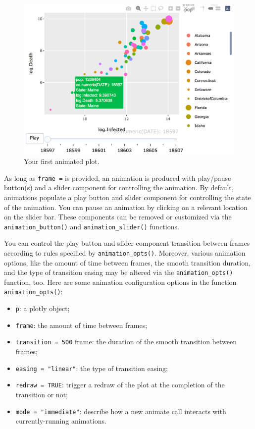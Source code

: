 \documentclass[]{book}
\providecommand{\tightlist}{%
  \setlength{\itemsep}{0pt}\setlength{\parskip}{0pt}}
\begin{document}
\begin{figure}

{\centering \includegraphics[width=1\linewidth]{figures/animation1} 

}

\caption{Your first animated plot.}\label{fig:animate1}
\end{figure}

As long as \texttt{frame\ =} is provided, an animation is produced with
play/pause button(s) and a slider component for controlling the
animation. By default, animations populate a play button and slider
component for controlling the state of the animation. You can pause an
animation by clicking on a relevant location on the slider bar. These
components can be removed or customized via the
\texttt{animation\_button()} and \texttt{animation\_slider()} functions.

You can control the play button and slider component transition between
frames according to rules specified by \texttt{animation\_opts()}.
Moreover, various animation options, like the amount of time between
frames, the smooth transition duration, and the type of transition
easing may be altered via the \texttt{animation\_opts()} function, too.
Here are some animation configuration options in the function
\texttt{animation\_opts()}:

\begin{itemize}
\tightlist
\item
  \texttt{p}: a plotly object;
\item
  \texttt{frame}: the amount of time between frames;
\item
  \texttt{transition\ =\ 500} frame: the duration of the smooth
  transition between frames;
\item
  \texttt{easing\ =\ "linear"}: the type of transition easing;
\item
  \texttt{redraw\ =\ TRUE}: trigger a redraw of the plot at the
  completion of the transition or not;
\item
  \texttt{mode\ =\ "immediate"}: describe how a new animate call
  interacts with currently-running animations.
\end{itemize}
\end{document}
